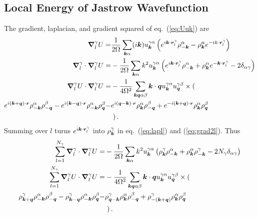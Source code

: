 \subsection{Local Energy of Jastrow Wavefunction}
The gradient, laplacian, and gradient squared of eq.~(\ref{eq:Uuk}) are
\begin{align}
\boldsymbol{\nabla}_l^\gamma U =& \frac{1}{2\Omega} \sum\limits_{\boldsymbol{k}\alpha} (i\boldsymbol{k})u_{\boldsymbol{k}}^{\gamma\alpha} \left(
e^{i\boldsymbol{k}\cdot\boldsymbol{r}_l^\gamma}\rho_{-\boldsymbol{k}}^\alpha - \rho_{\boldsymbol{k}}^\alpha e^{-ik\cdot\boldsymbol{r}_l^\gamma}
\right) \\
\boldsymbol{\nabla}_l^\gamma\cdot\boldsymbol{\nabla}_l^\gamma U =& -\frac{1}{2\Omega}\sum\limits_{\boldsymbol{k}\alpha} k^2u_{\boldsymbol{k}}^{\gamma\alpha}\left(
e^{i\boldsymbol{k}\cdot\boldsymbol{r}_l^\gamma}\rho_{-\boldsymbol{k}}^\alpha + \rho_{\boldsymbol{k}}^\alpha e^{-\boldsymbol{k}\cdot\boldsymbol{r}_l^\gamma} - 2\delta_{\alpha\gamma}
\right) \label{eq:lapl}\\
\boldsymbol{\nabla}_l^\gamma U\cdot\boldsymbol{\nabla}_l^\gamma U =& -\frac{1}{4\Omega^2}\sum\limits_{\boldsymbol{k}\boldsymbol{q}\alpha\beta}\boldsymbol{k}\cdot\boldsymbol{q} u_{\boldsymbol{k}}^{\gamma\alpha}u_{\boldsymbol{q}}^{\gamma\beta} \times\left(\right.\nonumber \\
e^{i(\boldsymbol{k}+\boldsymbol{q})\cdot\boldsymbol{r}}\rho_{-\boldsymbol{k}}^\alpha\rho_{-\boldsymbol{q}}^\beta -
e^{i(\boldsymbol{k}-\boldsymbol{q})\cdot\boldsymbol{r}}\rho_{-\boldsymbol{k}}^\alpha\rho_{\boldsymbol{q}}^\beta -&
e^{i(\boldsymbol{q}-\boldsymbol{k})\cdot\boldsymbol{r}}\rho_{\boldsymbol{k}}^\alpha\rho_{-\boldsymbol{q}}^\beta +
e^{-i(\boldsymbol{k}+\boldsymbol{q})\cdot\boldsymbol{r}}\rho_{\boldsymbol{k}}^\alpha\rho_{\boldsymbol{q}}^\beta \nonumber \\
&\left.\right) \label{eq:grad2l}.
\end{align}
Summing over $l$ turns $e^{i\boldsymbol{k}\cdot\boldsymbol{r}_l^\gamma}$ into $\rho_{\boldsymbol{k}}^\gamma$ in eq.~(\ref{eq:lapl}) and (\ref{eq:grad2l}). Thus
\begin{align}
\sum\limits_{l=1}^{N_\gamma}\boldsymbol{\nabla}_l^\gamma\cdot\boldsymbol{\nabla}_l^\gamma U =& -\frac{1}{2\Omega}\sum\limits_{\boldsymbol{k}\alpha} k^2u_{\boldsymbol{k}}^{\gamma\alpha}\left(
\rho_{\boldsymbol{k}}^\gamma\rho_{-\boldsymbol{k}}^\alpha + \rho_{\boldsymbol{k}}^\alpha \rho_{-\boldsymbol{k}}^\gamma - 2N_\gamma\delta_{\alpha\gamma}
\right) \label{eq:lap}\\
\sum\limits_{l=1}^{N_\gamma}\boldsymbol{\nabla}_l^\gamma U\cdot\boldsymbol{\nabla}_l^\gamma U =& -\frac{1}{4\Omega^2}\sum\limits_{\boldsymbol{k}\boldsymbol{q}\alpha\beta}\boldsymbol{k}\cdot\boldsymbol{q} u_{\boldsymbol{k}}^{\gamma\alpha}u_{\boldsymbol{q}}^{\gamma\beta} \times\left(\right.\nonumber \\
\rho_{\boldsymbol{k}+\boldsymbol{q}}^\gamma\rho_{-\boldsymbol{k}}^\alpha\rho_{-\boldsymbol{q}}^\beta -
\rho_{\boldsymbol{k}-\boldsymbol{q}}^\gamma\rho_{-\boldsymbol{k}}^\alpha\rho_{\boldsymbol{q}}^\beta -&
\rho_{\boldsymbol{q}-\boldsymbol{k}}^\gamma\rho_{\boldsymbol{k}}^\alpha\rho_{-\boldsymbol{q}}^\beta +
\rho_{-(\boldsymbol{k}+\boldsymbol{q})}^\gamma\rho_{\boldsymbol{k}}^\alpha\rho_{\boldsymbol{q}}^\beta \nonumber \\
&\left.\right) \label{eq:grad2}.
\end{align}
